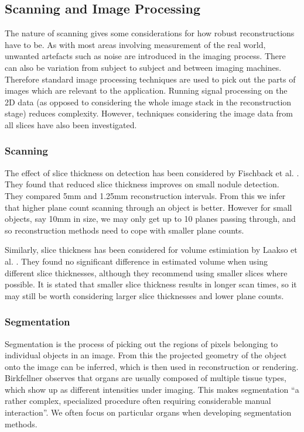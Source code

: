 \documentclass[11p, titlepage]{article}
\begin{document}
\subsection{Scanning and Image Processing}

The nature of scanning gives some considerations for how robust reconstructions have to be. As with most areas involving measurement of the real world, unwanted artefacts such as noise are introduced in the imaging process. There can also be variation from subject to subject and between imaging machines. Therefore standard image processing techniques are used to pick out the parts of images which are relevant to the application. Running signal processing on the 2D data (as opposed to considering the whole image stack in the reconstruction stage) reduces complexity. However, techniques considering the image data from all slices have also been investigated.

\subsubsection{Scanning}

The effect of slice thickness on detection has been considered by Fischback et al. \cite{fischbach2003detection}. They found that reduced slice thickness improves on small nodule detection. They compared 5mm and 1.25mm reconstruction intervals. From this we infer that higher plane count scanning through an object is better. However for small objects, say 10mm in size, we may only get up to 10 planes passing through, and so reconstruction methods need to cope with smaller plane counts.

Similarly, slice thickness has been considered for volume estimiation by Laakso et al. \cite{laakso1997mri}. They found no significant difference in estimated volume when using different slice thicknesses, although they recommend using smaller slices where possible. It is stated that smaller slice thickness results in longer scan times, so it may still be worth considering larger slice thicknesses and lower plane counts.

\subsubsection{Segmentation}

Segmentation is the process of picking out the regions of pixels belonging to individual objects in an image. From this the projected geometry of the object onto the image can be inferred, which is then used in reconstruction or rendering. Birkfellner \cite{birkfellner2016applied} observes that organs are usually composed of multiple tissue types, which show up as different intensities under imaging. This makes segmentation ``a rather complex, specialized procedure often requiring considerable manual interaction''. We often focus on particular organs when developing segmentation methods.
\end{document}
